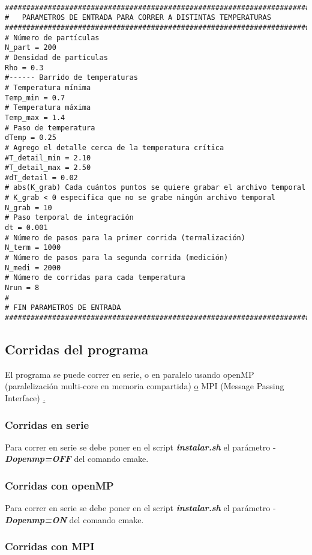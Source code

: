 \begin{verbatim}

###############################################################################       
#   PARAMETROS DE ENTRADA PARA CORRER A DISTINTAS TEMPERATURAS
###############################################################################
# Número de partículas
N_part = 200
# Densidad de partículas
Rho = 0.3
#------ Barrido de temperaturas
# Temperatura mínima
Temp_min = 0.7
# Temperatura máxima
Temp_max = 1.4
# Paso de temperatura
dTemp = 0.25
# Agrego el detalle cerca de la temperatura crítica
#T_detail_min = 2.10
#T_detail_max = 2.50
#dT_detail = 0.02
# abs(K_grab) Cada cuántos puntos se quiere grabar el archivo temporal
# K_grab < 0 especifica que no se grabe ningún archivo temporal
N_grab = 10
# Paso temporal de integración
dt = 0.001
# Número de pasos para la primer corrida (termalización)
N_term = 1000
# Número de pasos para la segunda corrida (medición)
N_medi = 2000
# Número de corridas para cada temperatura
Nrun = 8
#
# FIN PARAMETROS DE ENTRADA
###############################################################################

\end{verbatim}

\subsection{Corridas del programa}

El programa se puede correr en serie, o en paralelo usando openMP 
(paralelización multi-core en memoria compartida) \href{http://openmp.org/}
o MPI (Message Passing Interface) \href{http://www.open-mpi.org/} .

\subsubsection{Corridas en serie}
Para correr en serie se debe poner en el script \textbf{\textit{instalar.sh}}
el parámetro -\textbf{\textit{Dopenmp=OFF}} del comando cmake.

\subsubsection{Corridas con openMP}
Para correr en serie se debe poner en el script \textbf{\textit{instalar.sh}}
el parámetro -\textbf{\textit{Dopenmp=ON}} del comando cmake.

\subsubsection{Corridas con MPI}

